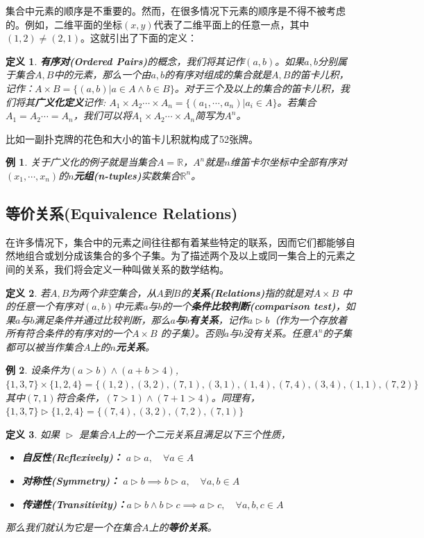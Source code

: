 \documentclass[mathserif,hyperref,UTF8,openany,b5paper]{ctexbook}
\newtheorem{exmp}{例}[section]
\newtheorem{defn}{定义}[section]
\begin{document}
集合中元素的顺序是不重要的。然而，在很多情况下元素的顺序是不得不被考虑的。例如，二维平面的坐标$(x,y)$代表了二维平面上的任意一点，其中$(1,2)\not =(2,1)$。这就引出了下面的定义：
\begin{defn}
\textbf{有序对(Ordered Pairs)}的概念，我们将其记作$(a,b)$。如果$a,b$分别属于集合$A,B$中的元素，那么一个由$a,b$的有序对组成的集合就是$A,B$的笛卡儿积，记作：$\boxed{A\times B = \{(a,b)|a \in A \land b \in B\}}$。对于三个及以上的集合的笛卡儿积，我们将其\textbf{广义化定义}记作: $A_1\times A_2 \cdots \times A_n = \{(a_1,\cdots,a_n)|a_i \in A\}$。若集合$A_1=A_2 \cdots = A_n$，我们可以将$A_1\times A_2 \cdots \times A_n $简写为$A^n$。
\end{defn}
比如一副扑克牌的花色和大小的笛卡儿积就构成了52张牌。
\begin{exmp}
关于广义化的例子就是当集合$A=\mathbb{R}$，$A^n$就是$n$维笛卡尔坐标中全部有序对$(x_1,\cdots,x_n)$的\textbf{$n$元组(n-tuples)}实数集合$\mathbb{R}^n$。
\end{exmp}
\subsection{等价关系(Equivalence Relations)}
在许多情况下，集合中的元素之间往往都有着某些特定的联系，因而它们都能够自然地组合或划分成该集合的多个子集。为了描述两个及以上或同一集合上的元素之间的关系，我们将会定义一种叫做关系的数学结构。
\begin{defn}
若$A,B$为两个非空集合，从$A$到$B$的\textbf{关系(Relations)}指的就是对$A \times B$ 中的任意一个有序对$(a,b)$中元素$a$与$b$的一个\textbf{条件比较判断(comparison test)}，如果$a$与$b$满足条件并通过比较判断，那么\textbf{$a$与$b$有关系}，记作$a\vartriangleright b$（作为一个存放着所有符合条件的有序对的一个$A \times B$ 的子集）。否则$a$与$b$没有关系。任意$A^n$的子集都可以被当作集合$A$上的\textbf{$n$元关系}。
\end{defn}
\begin{exmp}
设条件为$(a > b) \land (a+b>4)$,
$\{1,3,7\}\times \{1,2,4\} = \{(1, 2), (3, 2), (7, 1), (3, 1), (1, 4), (7, 4), (3, 4), (1, 1), (7, 2)\}$
其中$(7,1)$符合条件，$(7>1)\land (7+1>4)$。同理有，\\
$\{1,3,7\}\vartriangleright \{1,2,4\} = \{(7, 4), (3, 2), (7, 2), (7, 1)\}$
\end{exmp}
\begin{defn}
如果 $\vartriangleright$ 是集合$A$上的一个二元关系且满足以下三个性质，
\begin{itemize}
\item \textbf{自反性(Reflexively)：} $a \vartriangleright a, \quad \forall a\in A$
\item \textbf{对称性(Symmetry)：} $a \vartriangleright b \implies b \vartriangleright a,\quad \forall a,b\in A$
\item \textbf{传递性(Transitivity)：}$a \vartriangleright b \land b \vartriangleright c \implies a \vartriangleright c  ,\quad \forall a,b,c\in A$
\end{itemize}
那么我们就认为它是一个在集合$A$上的\textbf{等价关系}。
\end{defn}
\end{document}
